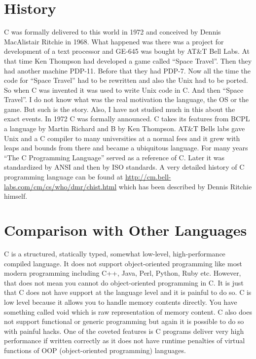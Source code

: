 \section{History}
C was formally delivered to this world in 1972 and conceived by Dennis
MacAlistair Ritchie in 1968. What happened was there was a project for
development of a text processor and GE-645 was bought by AT\&T Bell Labs. At
that time Ken Thompson had developed a game called ``Space Travel''. Then they
had another machine PDP-11. Before that they had PDP-7. Now all the time the
code for ``Space Travel'' had to be rewritten and also the Unix had to be
ported. So when C was invented it was used to write Unix code in C. And then
``Space Travel''. I do not know what was the real motivation the language, the
OS or the game. But such is the story. Also, I have not studied much in this 
about the exact events. In 1972 C was formally announced. C takes its features
from BCPL a language by Martin Richard and B by Ken Thompson. AT\&T Bells labs
gave Unix and a C compiler to many universities at a normal fees and it grew
with leaps and bounds from there and became a ubiquitous language. For many
years ``The C Programming Language'' served as a reference of C. Later it was
standardized by ANSI and then by ISO standards. A very detailed history of C
programming language can be found at
\url{http://cm.bell-labs.com/cm/cs/who/dmr/chist.html} which has been described
by Dennis Ritchie himself.

\section{Comparison with Other Languages}
C is a structured, statically typed, somewhat low-level, high-performance
compiled language. It does not support object-oriented programming like most
modern programming including C++, Java, Perl, Python, Ruby etc. However, that
does not mean you cannot do object-oriented programming in C. It is just that C
does not have support at the language level and it is painful to do so. C is
low level because it allows you to handle memory contents directly. You have
something called void which is raw representation of memory content. C also
does not support functional or generic programming but again it is possible to
do so with painful hacks. One of the coveted features is C programs deliver
very high performance if written correctly as it does not have runtime
penalties of virtual functions of OOP (object-oriented programming) languages.

